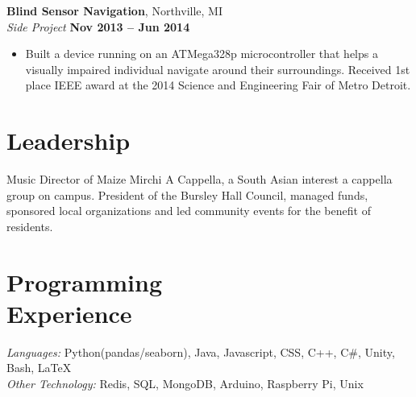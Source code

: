 \documentclass[margin,line]{resume}
\begin{document}
\begin{resume}
    \textbf{Blind Sensor Navigation}, Northville, MI \vspace{2mm}\\\vspace{1mm}%
	\textsl{Side Project} \hfill \textbf{Nov 2013 -- Jun 2014}
	\begin{itemize}
		\item Built a device running on an ATMega328p micro­controller that helps a visually impaired individual navigate around their surroundings. Received 1st place IEEE award at the 2014 Science and Engineering Fair of Metro Detroit. 
	\end{itemize}
	


   \section{\mysidestyle Leadership}
    Music Director of Maize Mirchi A Cappella, a South Asian interest a cappella group on campus. President of the Bursley Hall Council, managed funds, sponsored local organizations and led community events for the benefit of residents. 
\vspace{-2mm}

    \section{\mysidestyle Programming\\Experience}

    \emph{Languages:} Python(pandas/seaborn), Java, Javascript, CSS, C++, C\#, Unity, Bash, \LaTeX \\
    \emph{Other Technology:} Redis, SQL, MongoDB, Arduino, Raspberry Pi, Unix
\end{resume}
\end{document}
